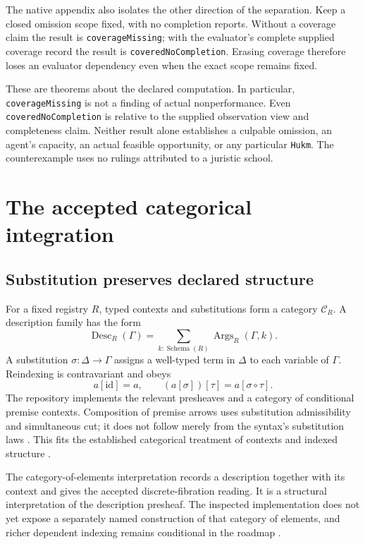 \documentclass[11pt]{article}
\newcommand{\op}[1]{\operatorname{#1}}
\begin{document}
The native appendix also isolates the other direction of the separation. Keep a closed omission scope fixed, with no completion reports. Without a coverage claim the result is \texttt{coverageMissing}; with the evaluator's complete supplied coverage record the result is \texttt{coveredNoCompletion}. Erasing coverage therefore loses an evaluator dependency even when the exact scope remains fixed.

These are theorems about the declared computation. In particular, \texttt{coverageMissing} is not a finding of actual nonperformance. Even \texttt{coveredNoCompletion} is relative to the supplied observation view and completeness claim. Neither result alone establishes a culpable omission, an agent's capacity, an actual feasible opportunity, or any particular \texttt{Hukm}. The counterexample uses no rulings attributed to a juristic school.

\section{The accepted categorical integration}

\subsection{Substitution preserves declared structure}

For a fixed registry \(R\), typed contexts and substitutions form a category \(\mathcal C_R\). A description family has the form
\[
 \op{Desc}_R(\Gamma)=
 \sum_{k:\op{Schema}(R)}\op{Args}_R(\Gamma,k).
\]
A substitution \(\sigma:\Delta\to\Gamma\) assigns a well-typed term in \(\Delta\) to each variable of \(\Gamma\). Reindexing is contravariant and obeys
\[
 a[\mathrm{id}]=a,\qquad
 (a[\sigma])[\tau]=a[\sigma\circ\tau].
\]
The repository implements the relevant presheaves and a category of conditional premise contexts. Composition of premise arrows uses substitution admissibility and simultaneous cut; it does not follow merely from the syntax's substitution laws \cite{substitution}. This fits the established categorical treatment of contexts and indexed structure \cite{awodey,jacobs}.

The category-of-elements interpretation records a description together with its context and gives the accepted discrete-fibration reading. It is a structural interpretation of the description presheaf. The inspected implementation does not yet expose a separately named construction of that category of elements, and richer dependent indexing remains conditional in the roadmap \cite{design}.
\end{document}
